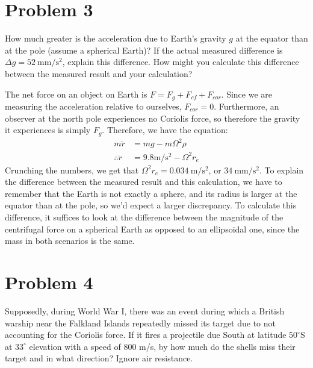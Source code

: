 \documentclass[10pt]{article}
\begin{document}
	\pagebreak
	\section*{Problem 3}
	How much greater is the acceleration due to Earth's gravity $g$ at the equator than at the pole (assume a 
	spherical Earth)? If the actual measured difference is $\Delta g = 52 \ \mathrm{mm/s^2}$, explain this 
	difference. How might you calculate this difference between the measured result and your calculation?

	\begin{solution}
		The net force on an object on Earth is $F = F_g + F_{cf} + F_{cor}$. Since we are measuring the 
		acceleration relative to ourselves, $F_{cor} = 0$. Furthermore, an observer at the north pole experiences
		no Coriolis force, so therefore the gravity it experiences is simply $F_g$. Therefore, we have the
		equation:
		\begin{align*}
			m\ddot r &= mg - m\Omega^2 \rho \\
			\therefore \ddot r &= 9.8 \mathrm{m/s^2} - \Omega^2 r_e
		\end{align*}
		Crunching the numbers, we get that $\Omega^2 r_e = 0.034 \ \mathrm{m/s^2}$, or $34 \ \mathrm{mm/s^2}$.
		To explain the difference between the measured result and this calculation, we have to remember that 
		the Earth is not exactly a sphere, and its radius is larger at the equator than at the pole, so we'd 
		expect a larger discrepancy. To calculate this difference, it suffices to look at the difference between
		the magnitude of the centrifugal force on a spherical Earth as opposed to an ellipsoidal one, since
		the mass in both scenarios is the same. 
	\end{solution}

	\pagebreak
	\section*{Problem 4}
	Supposedly, during World War I, there was an event during which a British warship near the Falkland Islands
	repeatedly missed its target due to not accounting for the Coriolis force. If it fires a projectile due 
	South at latitude $50^\circ$S at $33^\circ$ elevation with a speed of 800  m/s, by how much do the shells
	miss their target and in what direction? Ignore air resistance. 
\end{document}
